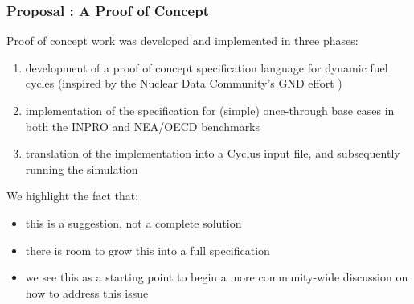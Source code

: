 
\begin{frame}[ctb!]
  \frametitle{Proposal : A Proof of Concept} 

  Proof of concept work was developed and implemented in three phases:

  \begin{enumerate}
    \item development of a proof of concept specification language for dynamic
      fuel cycles (inspired by the Nuclear Data Community's GND effort
      \cite{mattoon_generalized_2012})
    \item implementation of the specification for (simple) once-through base
      cases in both the INPRO and NEA/OECD benchmarks
    \item translation of the implementation into a Cyclus input file, and
      subsequently running the simulation
  \end{enumerate}

  \pause

  \vspace{0.4cm}
  
  We highlight the fact that:

  \begin{itemize}
    \item this is a suggestion, not a complete solution
    \item there is room to grow this into a full specification
    \item we see this as a starting point to begin a more community-wide
      discussion on how to address this issue
  \end{itemize}
\end{frame}

